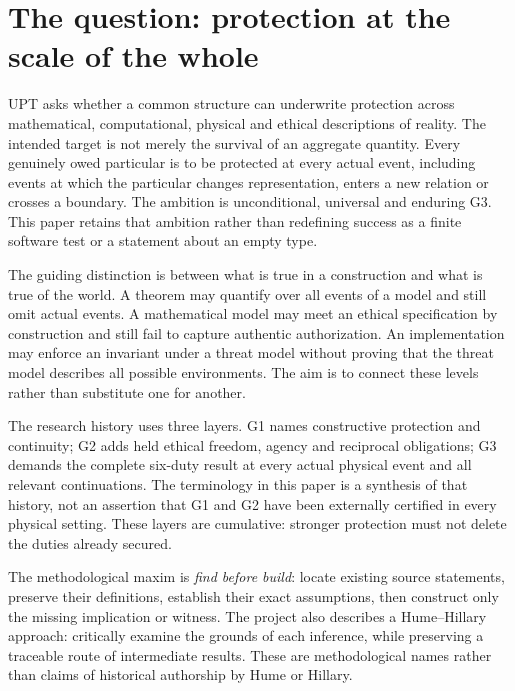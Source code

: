 \documentclass[11pt,a4paper]{article}
\begin{document}
\section{The question: protection at the scale of the whole}
UPT asks whether a common structure can underwrite protection across mathematical, computational, physical and ethical descriptions of reality. The intended target is not merely the survival of an aggregate quantity. Every genuinely owed particular is to be protected at every actual event, including events at which the particular changes representation, enters a new relation or crosses a boundary. The ambition is unconditional, universal and enduring G3. This paper retains that ambition rather than redefining success as a finite software test or a statement about an empty type.

The guiding distinction is between what is true in a construction and what is true of the world. A theorem may quantify over all events of a model and still omit actual events. A mathematical model may meet an ethical specification by construction and still fail to capture authentic authorization. An implementation may enforce an invariant under a threat model without proving that the threat model describes all possible environments. The aim is to connect these levels rather than substitute one for another.

The research history uses three layers. G1 names constructive protection and continuity; G2 adds held ethical freedom, agency and reciprocal obligations; G3 demands the complete six-duty result at every actual physical event and all relevant continuations. The terminology in this paper is a synthesis of that history, not an assertion that G1 and G2 have been externally certified in every physical setting. These layers are cumulative: stronger protection must not delete the duties already secured.

The methodological maxim is \emph{find before build}: locate existing source statements, preserve their definitions, establish their exact assumptions, then construct only the missing implication or witness. The project also describes a Hume--Hillary approach: critically examine the grounds of each inference, while preserving a traceable route of intermediate results. These are methodological names rather than claims of historical authorship by Hume or Hillary.
\end{document}
